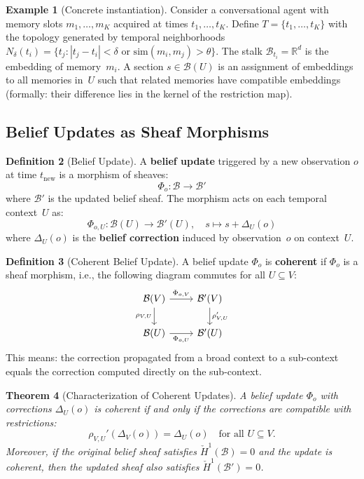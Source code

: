 \documentclass[11pt,a4paper]{article}
\theoremstyle{plain}
\newtheorem{theorem}{Theorem}[section]
\theoremstyle{definition}
\newtheorem{definition}[theorem]{Definition}
\newtheorem{example}[theorem]{Example}
\theoremstyle{remark}
\newcommand{\R}{\mathbb{R}}
\newcommand{\cB}{\mathcal{B}}
\newcommand{\CechH}{\check{H}}
\begin{document}
\begin{example}[Concrete instantiation]\label{ex:belief}
Consider a conversational agent with memory slots $m_1, \ldots, m_K$ acquired at times $t_1, \ldots, t_K$. Define $T = \{t_1, \ldots, t_K\}$ with the topology generated by temporal neighborhoods $N_\delta(t_i) = \{t_j : |t_j - t_i| < \delta \text{ or } \mathrm{sim}(m_i, m_j) > \theta\}$. The stalk $\cB_{t_i} = \R^d$ is the embedding of memory~$m_i$. A section $s \in \cB(U)$ is an assignment of embeddings to all memories in~$U$ such that related memories have compatible embeddings (formally: their difference lies in the kernel of the restriction map).
\end{example}

\subsection{Belief Updates as Sheaf Morphisms}

\begin{definition}[Belief Update]\label{def:belief-update}
A \textbf{belief update} triggered by a new observation $o$ at time $t_{\mathrm{new}}$ is a morphism of sheaves:
\[
\Phi_o: \cB \to \cB'
\]
where $\cB'$ is the updated belief sheaf. The morphism acts on each temporal context~$U$ as:
\[
\Phi_{o,U}: \cB(U) \to \cB'(U), \quad s \mapsto s + \Delta_U(o)
\]
where $\Delta_U(o)$ is the \textbf{belief correction} induced by observation~$o$ on context~$U$.
\end{definition}

\begin{definition}[Coherent Belief Update]\label{def:coherent-update}
A belief update $\Phi_o$ is \textbf{coherent} if $\Phi_o$ is a sheaf morphism, i.e., the following diagram commutes for all $U \subseteq V$:
\[
\begin{tikzcd}
\cB(V) \arrow[r, "\Phi_{o,V}"] \arrow[d, "\rho_{V,U}"'] & \cB'(V) \arrow[d, "\rho_{V,U}'"]\\
\cB(U) \arrow[r, "\Phi_{o,U}"'] & \cB'(U)
\end{tikzcd}
\]
This means: the correction propagated from a broad context to a sub-context equals the correction computed directly on the sub-context.
\end{definition}

\begin{theorem}[Characterization of Coherent Updates]\label{thm:coherent-update}
A belief update $\Phi_o$ with corrections $\Delta_U(o)$ is coherent if and only if the corrections are compatible with restrictions:
\begin{equation}\label{eq:coherent-condition}
\rho_{V,U}'(\Delta_V(o)) = \Delta_U(o) \quad \text{for all } U \subseteq V.
\end{equation}
Moreover, if the original belief sheaf satisfies $\CechH^1(\cB) = 0$ and the update is coherent, then the updated sheaf also satisfies $\CechH^1(\cB') = 0$.
\end{theorem}
\end{document}
